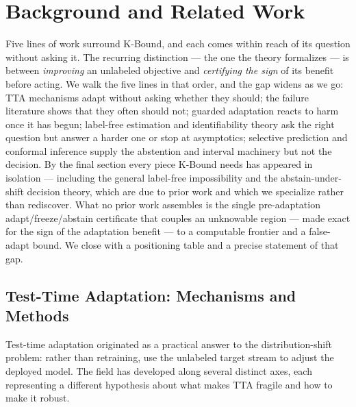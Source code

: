 
\chapter{Background and Related Work}\label{ch:related}

Five lines of work surround K-Bound, and each comes within reach of its
question without asking it. The recurring distinction --- the one the theory
formalizes --- is between \emph{improving} an unlabeled objective and
\emph{certifying the sign} of its benefit before acting. We walk the five lines
in that order, and the gap widens as we go: TTA mechanisms adapt without asking
whether they should; the failure literature shows that they often should not;
guarded adaptation reacts to harm once it has begun; label-free estimation and
identifiability theory ask the right question but answer a harder one or stop at
asymptotics; selective prediction and conformal inference supply the abstention
and interval machinery but not the decision. By the final section every piece K-Bound
needs has appeared in isolation --- including the general label-free impossibility
and the abstain-under-shift decision theory, which are due to prior work
\cite{garg2022atc,kalai2021abstain} and which we specialize rather than rediscover.
What no prior work assembles is the single pre-adaptation adapt/freeze/abstain
certificate that couples an unknowable region --- made exact for the sign of the
adaptation benefit --- to a computable frontier and a false-adapt bound. We close
with a positioning table and a precise statement of that gap.

\section{Test-Time Adaptation: Mechanisms and Methods}\label{sec:rel-tta}

Test-time adaptation originated as a practical answer to the distribution-shift
problem: rather than retraining, use the unlabeled target stream to adjust the
deployed model.
The field has developed along several distinct axes, each representing a
different hypothesis about what makes TTA fragile and how to make it robust.

